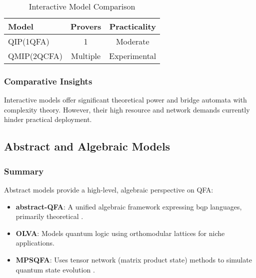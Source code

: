 \begin{table}[ht]
\centering
\label{tab:interactive}
\begin{tabular}{|l|c|c|}
\hline
\textbf{Model} & \textbf{Provers} & \textbf{Practicality} \\ \hline
QIP(1QFA) & 1 & Moderate \\ \hline
QMIP(2QCFA) & Multiple & Experimental \\ \hline
\end{tabular}
\caption{Interactive Model Comparison}
\end{table}

\subsubsection{Comparative Insights}
Interactive models offer significant theoretical power and bridge automata with complexity theory. However, their high resource and network demands currently hinder practical deployment.

\subsection*{Abstract and Algebraic Models}

\subsubsection{Summary}
Abstract models provide a high-level, algebraic perspective on QFA:
\begin{itemize}
    \item \textbf{abstract-QFA}: A unified algebraic framework expressing \gls{bqp} languages, primarily theoretical \cite{manin1980computable}.
    \item \textbf{OLVA}: Models quantum logic using orthomodular lattices for niche applications.
    \item \textbf{MPSQFA}: Uses tensor network (matrix product state) methods to simulate quantum state evolution \cite{vidal2003efficient}.
\end{itemize}

